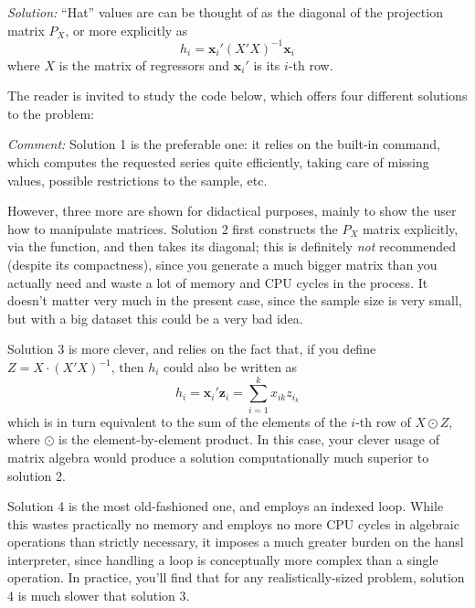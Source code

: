 \emph{Solution:}
``Hat'' values are can be thought of as the diagonal of the projection
matrix $P_X$, or more explicitly as
\[
h_i = \mathbf{x}_i' (X'X)^{-1} \mathbf{x}_i
\]
where $X$ is the matrix of regressors and $\mathbf{x}_i'$ is its
$i$-th row.

The reader is invited to study the code below, which offers four
different solutions to the problem:


\emph{Comment:} Solution 1 is the preferable one: it relies on the
built-in  command, which computes the requested series
quite efficiently, taking care of missing values, possible
restrictions to the sample, etc.

However, three more are shown for didactical purposes, mainly to show
the user how to manipulate matrices. Solution 2 first constructs the
$P_X$ matrix explicitly, via the  function, and then takes
its diagonal; this is definitely \emph{not} recommended (despite its
compactness), since you generate a much bigger matrix than you
actually need and waste a lot of memory and CPU cycles in the
process. It doesn't matter very much in the present case, since the
sample size is very small, but with a big dataset this could be a very
bad idea.

Solution 3 is more clever, and relies on the fact that, if you
define $Z = X\cdot(X'X)^{-1}$, then $h_i$ could also
be written as
\[
 h_i = \mathbf{x}_i' \mathbf{z}_i = \sum_{i=1}^k x_{ik} z_{i_k}
\]
which is in turn equivalent to the sum of the elements of the $i$-th
row of $X \odot Z$, where $\odot$ is the element-by-element
product. In this case, your clever usage of matrix algebra would
produce a solution computationally much superior to solution 2.

Solution 4 is the most old-fashioned one, and employs an indexed
loop. While this wastes practically no memory and employs no more CPU
cycles in algebraic operations than strictly necessary, it imposes a
much greater burden on the hansl interpreter, since handling a loop is
conceptually more complex than a single operation. In practice, you'll
find that for any realistically-sized problem, solution 4 is much
slower that solution 3.

